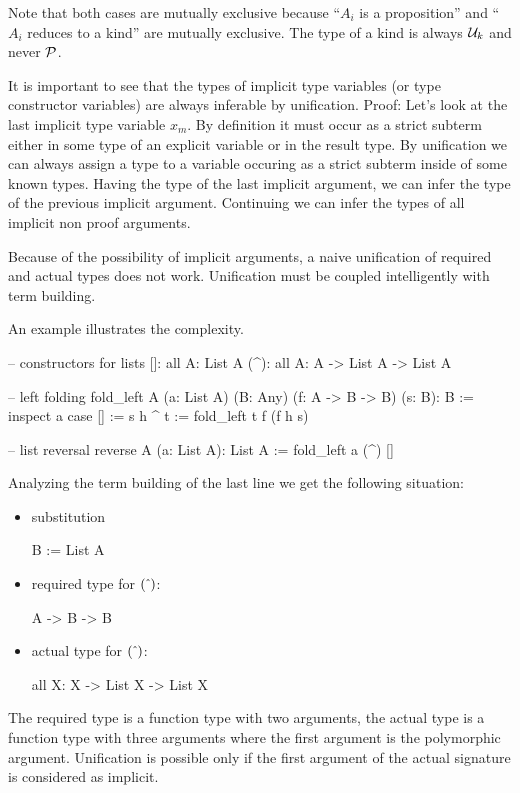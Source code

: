 Note that both cases are mutually exclusive because ``$A_i$ is a proposition''
and ``$A_i$ reduces to a kind'' are mutually exclusive. The type of a kind is
always ${\cal{U}}_k$ and never ${\cal{P}}$.

It is important to see that the types of implicit type variables (or type
constructor variables) are always inferable by unification. Proof: Let's look
at the last implicit type variable $x_m$. By definition it must occur as a
strict subterm either in some type of an explicit variable or in the result
type. By unification we can always assign a type to a variable occuring as a
strict subterm inside of some known types. Having the type of the last
implicit argument, we can infer the type of the previous implicit
argument. Continuing we can infer the types of all implicit non proof
arguments.


Because of the possibility of implicit arguments, a naive unification of
required and actual types does not work. Unification must be coupled
intelligently with term building.

An example illustrates the complexity.

\begin{alba}
  -- constructors for lists
  []:  all A: List A
  (^): all A: A -> List A -> List A

  -- left folding
  fold_left A (a: List A) (B: Any) (f: A -> B -> B) (s: B): B :=
    inspect a case
      [] :=
        s
      h ^ t :=
        fold_left t f (f h s)

   -- list reversal
   reverse A (a: List A): List A :=
     fold_left a (^) []
\end{alba}

Analyzing the term building of the last line we get the following situation:

\begin{itemize}
\item substitution
  \begin{alba}
    B := List A
  \end{alba}
\item required type for $(\mathrel{\hat{\ }})$:
  \begin{alba}
    A -> B -> B
  \end{alba}
\item actual type for $(\mathrel{\hat{\ }})$:
  \begin{alba}
    all X: X -> List X -> List X
  \end{alba}
\end{itemize}
The required type is a function type with two arguments, the actual type is a
function type with three arguments where the first argument is the polymorphic
argument. Unification is possible only if the first argument of the actual
signature is considered as implicit.


